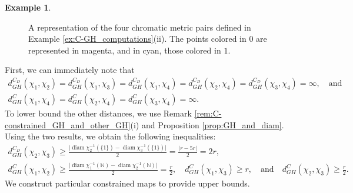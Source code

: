 \documentclass[8pt,a4paper,oneside,english,english]{article}
\theoremstyle{plain}
\theoremstyle
{plain}
\theoremstyle{definition}
\newtheorem{example}[theorem]{Example}%
\newcommand{\N}{\mathbb{N}}
\newcommand{\GH}{d_{GH}}
\DeclareMathOperator{\diam}{diam}
\begin{document}
\begin{example}
\begin{figure}[h!]
        \caption{\footnotesize A representation of the four chromatic metric pairs defined in Example \ref{ex:C-GH_computations}(ii). The points colored in $0$ are represented in magenta, and in cyan, those colored in $1$.}
        \label{fig:C-GH_computations}
    \end{figure}

     
    First, we can immediately note that
    \begin{gather*}
    \GH^{C_D}(\chi_1,\chi_2)=\GH^{C_D}(\chi_1,\chi_3)=\GH^{C_D}(\chi_1,\chi_4)=\GH^{C_D}(\chi_2,\chi_4)=\GH^{C_D}(\chi_3,\chi_4)=\infty,\quad\text{and}\\
    \GH^C(\chi_1,\chi_4)=\GH^C(\chi_2,\chi_4)=\GH^C(\chi_3,\chi_4)=\infty.
    \end{gather*}
    To lower bound the other distances, we use Remark \ref{rem:C-constrained_GH_and_other_GH}(i) and Proposition \ref{prop:GH_and_diam}. Using the two results, we obtain the following inequalities:
    \begin{gather*}
    \GH^{C_D}(\chi_2,\chi_3)\geq\frac{\lvert\diam\chi_2^{-1}(\{1\})-\diam\chi_3^{-1}(\{1\})\rvert}{2}=\frac{\lvert r-5r\rvert}{2}=2r,\\
    \GH^C(\chi_1,\chi_2)\geq \frac{\lvert\diam\chi_1^{-1}(\N)-\diam\chi_2^{-1}(\N)\rvert}{2}=\frac{r}{2},\quad \GH^C(\chi_1,\chi_3)\geq r,\quad\text{and}\quad \GH^C(\chi_2,\chi_3)\geq \frac{r}{2}.
    \end{gather*}
    We construct particular constrained maps to provide upper bounds. 
    

\end{example}
\end{document}
